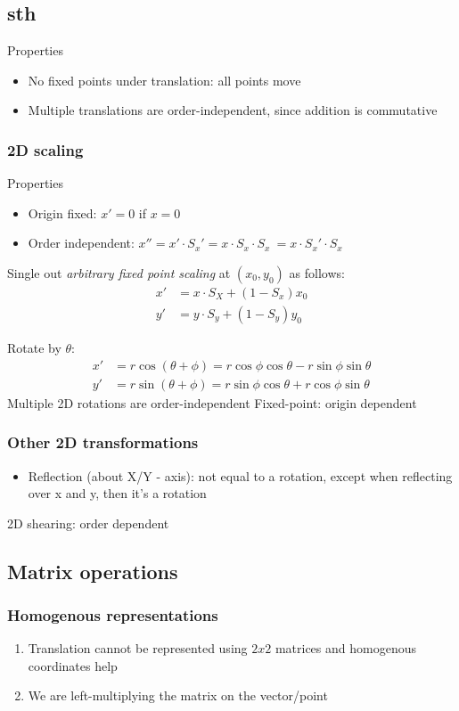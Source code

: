 \documentclass[11pt]{article}
\begin{document}
\subsection{sth} %
Properties
\begin{itemize}
    \item No fixed points under translation: all points move
    \item Multiple translations are order-independent, since addition is commutative 
\end{itemize}

\subsubsection{2D scaling}
Properties
\begin{itemize}
    \item Origin fixed: $x' = 0$ if $x=0$
    \item Order independent: $x'' = x' \cdot S_x' = x \cdot S_x \cdot S_x\  = x \cdot S_x' \cdot S_x$   
\end{itemize}
Single out \textit{arbitrary fixed point scaling} at $(x_0, y_0)$ as follows:
\begin{align*}
    x' &= x\cdot S_X + (1-S_x)x_0 \\
    y' &= y\cdot S_y  + (1-S_y)y_0
\end{align*} 

Rotate by $\theta$:
\begin{align*}
    x'&= r \cos (\theta + \phi) = r \cos \phi \cos \theta - r \sin \phi \sin \theta\\
    y' &= r \sin (\theta + \phi) = r \sin \phi \cos \theta + r \cos \phi \sin \theta
\end{align*} 
Multiple 2D rotations are order-independent
Fixed-point: origin dependent
\subsubsection{Other 2D transformations}
\begin{itemize}
    \item Reflection (about X/Y - axis): not equal to a rotation, except when reflecting over x and y, then it's a rotation
\end{itemize}
2D shearing: order dependent %

\subsection{Matrix operations} %


\subsubsection{Homogenous representations}
\begin{enumerate}
    \item Translation cannot be represented using $2 x 2$  matrices and homogenous coordinates help
    \item We are left-multiplying the matrix on the vector/point 
\end{enumerate}
\end{document}
